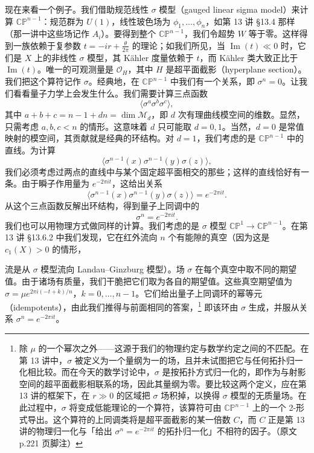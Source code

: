 现在来看一个例子。我们借助规范线性 $\sigma$ 模型（gauged linear sigma model）来计算 $\mathbb{CP}^{n-1}$：规范群为 $U(1)$，线性玻色场为 $\phi_1,\dots,\phi_n$，如第 13 讲 §13.4 那样（那一讲中这些场记作 $A_i$）。要得到整个 $\mathbb{CP}^{n-1}$，我们令超势 $W$ 等于零。这样得到一族依赖于复参数 $t=-ir+\frac{\theta}{2\pi}$ 的理论；如我们所见，当 $\operatorname{Im}(t)\ll0$ 时，它们是 $X$ 上的非线性 $\sigma$ 模型，其 Kähler 度量依赖于 $t$，而 Kähler 类大致正比于 $\operatorname{Im}(t)$。唯一的可观测量是 $\mathcal{O}_H$，其中 $H$ 是超平面截影（hyperplane section）。我们把这个算符记作 $\sigma$。经典地，在 $\mathbb{CP}^{n-1}$ 中我们有一个关系，即 $\sigma^n=0$。让我们看看量子力学上会发生什么。我们需要计算三点函数
\[
  \langle\sigma^a\sigma^b\sigma^c\rangle,
\]
其中 $a+b+c=n-1+dn=\dim\mathcal{M}_d$，即 $d$ 次有理曲线模空间的维数。显然，只需考虑 $a,b,c<n$ 的情形。这意味着 $d$ 只可能取 $d=0,1$。当然，$d=0$ 是常值映射的模空间，其贡献就是经典的环结构。对 $d=1$，我们考虑的是 $\mathbb{CP}^{n-1}$ 中的直线。为计算
\[
  \langle\sigma^{n-1}(x)\sigma^{n-1}(y)\sigma(z)\rangle,
\]
我们必须考虑过两点的直线中与某个固定超平面相交的那些；这样的直线恰好有一条。由于瞬子作用量为 $e^{-2\pi it}$，这给出关系
\[
  \langle\sigma^{n-1}(x)\sigma^{n-1}(y)\sigma(z)\rangle=e^{-2\pi it}.
\]
从这个三点函数反解出环结构，得到量子上同调中的
\[
  \sigma^n=e^{-2\pi it}.
\]
我们也可以用物理方式做同样的计算。我们考虑的是 $\sigma$ 模型 $\mathbb{CP}^1\to\mathbb{CP}^{n-1}$。在第 13 讲 §13.6.2 中我们发现，它在红外流向 $n$ 个有能隙的真空（因为这是 $c_1(X)>0$ 的情形，



流是从 $\sigma$ 模型流向 Landau--Ginzburg 模型）。场 $\sigma$ 在每个真空中取不同的期望值。由于诸场有质量，我们干脆把它们取为各自的期望值。这些真空期望值为 $\sigma=\mu e^{2\pi i(-t+k)/n}$，$k=0,\dots,n-1$。它们给出量子上同调环的幂等元（idempotents），由此我们推得与前面相同的答案，\footnote{除 $\mu$ 的一个幂次之外——这源于我们的物理约定与数学约定之间的不匹配。在第 13 讲中，$\sigma$ 被定义为一个量纲为一的场，且并未试图把它与任何拓扑归一化相比较。而在今天的数学讨论中，$\sigma$ 是按拓扑方式归一化的，即作为与射影空间的超平面截影相联系的场，因此其量纲为零。要比较这两个定义，应在第 13 讲的框架下，在 $r\gg0$ 的区域把 $\sigma$ 场积掉，以换得 $\sigma$ 模型的无质量场。在此过程中，$\sigma$ 将变成低能理论的一个算符，该算符可由 $\mathbb{CP}^{n-1}$ 上的一个 2-形式导出。这个算符的上同调类将是超平面截影的某一倍数 $C$，而 $C$ 正是第 13 讲的物理归一化与「给出 $\sigma^n=e^{-2\pi it}$ 的拓扑归一化」不相符的因子。（原文 p.221 页脚注）} 即该环由 $\sigma$ 生成，并服从关系 $\sigma^n=e^{-2\pi it}$。

